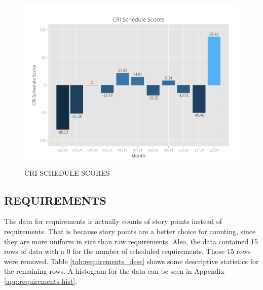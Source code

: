 \documentclass[SDSUThesis.tex]{subfiles}
\begin{document}
        \begin{figure}[ht]
            \centering
            \includegraphics[scale=.3]{images/schedule_scores.png}
            \caption{CRI SCHEDULE SCORES}
            \label{fig:schedule-scores}
        \end{figure}
        
        
    \subsection{REQUIREMENTS}
    \label{sec:case-req}
        The data for requirements is actually counts of story points
        instead of requirements.  That is because story points
        are a better choice for counting, since they are more
        uniform in size than raw requirements.  Also, the data
        contained 15 rows of data with a 0 for the number of
        scheduled requirements.  Those 15 rows were removed.
        Table \ref{tab:requirements_desc} shows some descriptive
        statistics for the remaining rows. A histogram for the
        data can be seen in Appendix \ref{app:requirements-hist}.
        
\end{document}

